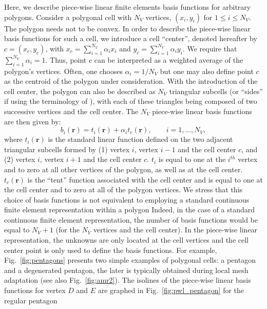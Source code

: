 \documentclass[preprint,10pt]{elsarticle}
\newcommand{\fig}[1]{Fig.~\ref{#1}}                      %
\newcommand\br{\mathbf{r}}
\begin{document}
Here, we describe piece-wise linear finite elements basis functions for
arbitrary polygons.
Consider a polygonal cell with $N_V$ vertices, $(x_i,y_i)$ for $1\le i \le N_V$. 
The polygon needs not to be convex. In order to describe the piece-wise linear basis functions
for such a cell, we introduce a cell ``center'', denoted hereafter 
by $c=(x_c,y_c)$, with $x_c =\sum_{i=1}^{N_V} \alpha_{i} x_i$
and  $y_c = \sum_{i=1}^{N_V} \alpha_{i} y_i$. We require that
$\sum_{i=1}^{N_V} \alpha_{i} = 1$. Thus, point $c$ can be interpreted as 
a weighted average of the polygon's vertices. Often, one chooses 
$\alpha_i = 1 / N_V$ but one may also define point $c$ as the centroid of the
polygon under consideration.
With the introduction of the cell center, the polygon can also be described as
$N_V$ triangular subcells (or ``sides'' if using the terminology of \cite{BaileyAdams2008}), 
with each of these triangles being composed of two
successive vertices and the cell center.
The $N_V$ piece-wise linear basis functions are then given by:
%
\begin{equation}
  b_i(\br) = t_i(\br) + \alpha_{i} t_c(\br) , \qquad i=1,\ldots,N_V ,
\end{equation}
%
where $t_i(\br)$ is the standard linear function defined on the two adjacent
triangular subcells formed by (1) vertex $i$, vertex $i-1$ and the cell center $c$,
and (2) vertex $i$, vertex $i+1$ and the cell center $c$.
$t_i$ is equal to one at the $i^{th}$ vertex and to zero at all other vertices of the polygon,
as well as at the cell center.
$t_c(\br)$ is the ``tent'' function associated with the cell center and is equal to one 
at the cell center and to zero at all of the polygon vertices.
%
We stress that this choice of basis functions is not equivalent to employing a standard 
continuous finite element representation within a polygon 
Indeed, in the case of a standard continuous finite 
element representation, the number of basis functions would be equal to $N_V+1$ 
(for the $N_V$ vertices and the cell center). In the
piece-wise linear representation, the unknowns are only located at the cell 
vertices and the cell center point is only used to define the basis functions.
For example, \fig{fig:pentagons} presents two simple examples of polygonal cells: a 
pentagon and a degenerated pentagon, the later is typically obtained
during local mesh adaptation (see also \fig{fig:amr2}).
The isolines of the piece-wise linear basis functions for vertex $D$ and
$E$ are graphed in \fig{fig:pwl_pentagon} for the regular pentagon
\end{document}
